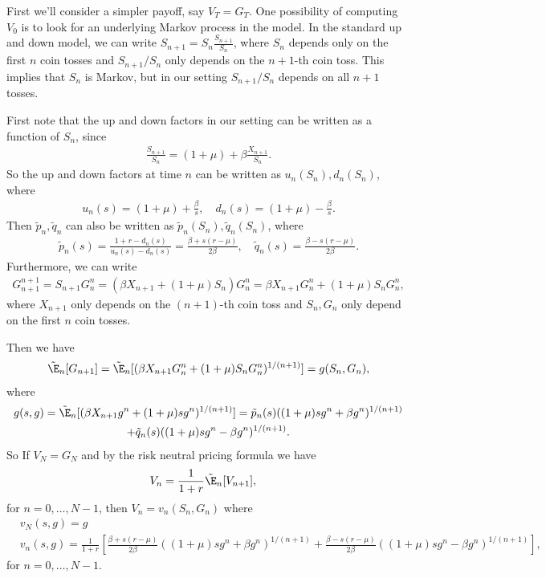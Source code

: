 First we'll consider a simpler payoff, say $V_T = G_T$. One possibility of computing $V_0$ is to look for an underlying Markov process in the model. In the standard up and down model, we can write $S_{n+1} = S_{n} \frac{S_{n+1}}{S_n}$, where $S_n$ depends only on the first $n$ coin tosses and $S_{n+1}/S_n$ only depends on the $n+1$-th coin toss. This implies that $S_n$ is Markov, but in our setting $S_{n+1}/S_{n}$ depends on all $n+1$ tosses. 

First note that the up and down factors in our setting can be written as a function of $S_n$, since 
\begin{align}
	 \frac{S_{n+1}}{S_n} = (1+\mu) + \beta \frac{X_{n+1}}{S_n}.
\end{align}
So the up and down factors at time $n$ can be written as $u_n(S_n), d_n(S_n)$, where 
\begin{align}
	 u_n(s) = (1+ \mu) + \frac{\beta}{s}, \quad d_n(s) = (1+\mu) - \frac{\beta}{s}.
\end{align}
Then $\tilde{p}_n, \tilde{q}_n$ can also be written as $\tilde{p}_n(S_n), \tilde{q}_n(S_n)$, where 
\begin{align}
	 \tilde{p}_n(s) = \frac{1 + r - d_n(s)}{u_n(s) - d_n(s)} = \frac{ \beta + s( r-\mu) }{2\beta}, \quad \tilde{q}_n (s) = \frac{ \beta -  s( r-\mu) }{2\beta}.
\end{align}
Furthermore, we can write
\begin{align}
	 G_{n+1}^{n+1} = S_{n+1} G_n^{n} = (\beta X_{n+1} + (1+\mu)S_n) G_n^n = \beta X_{n+1} G_n^n + (1+\mu)S_n G_n^n,
\end{align}
where $X_{n+1}$ only depends on the $(n+1)$-th coin toss and $S_n, G_n$ only depend on the first $n$ coin tosses. 

Then we have 
\begin{align}
	 \tilde{\E}_n[G_{n+1}] = \tilde{\E}_n[(\beta X_{n+1} G_n^n + (1+\mu)S_n G_n^n)^{1/(n+1)} ] = g(S_n, G_n),
\end{align}
where 
\begin{multline}
	 g(s,g) = \tilde{\E}_n [ (\beta X_{n+1} g^n + (1+\mu) sg^n)^{1/(n+1)} ] = \tilde{p}_n(s) ((1+\mu)sg^n + \beta g^n)^{1/(n+1)} \\ + \tilde{q}_n(s) ((1+\mu)sg^n - \beta g^n)^{1/(n+1)}.
\end{multline}
So If $V_N = G_N$ and by the risk neutral pricing formula we have
\begin{align}
	 V_n = \frac{1}{1+r}\tilde{\E}_n[ V_{n+1}], \quad 
\end{align}
for $n = 0, \ldots , N-1$, then $V_n = v_n(S_n ,G_n)$ where 
\begin{align}
	 &v_N (s,g) = g \\
	 &v_n (s,g) =\frac{1}{1+r} \left[ \frac{ \beta + s( r-\mu) }{2\beta} ((1+\mu)sg^n + \beta g^n)^{1/(n+1)} + \frac{ \beta -  s( r-\mu) }{2\beta}((1+\mu)sg^n - \beta g^n)^{1/(n+1)} \right], 
\end{align}
for $n= 0, \ldots , N-1$.

